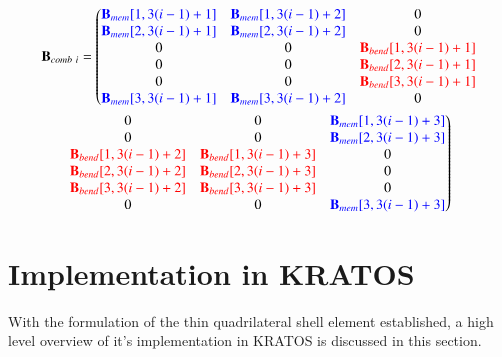 \begin{multline}
	\mathbf{B}_{comb\ i} = \left(
	\begin{matrix}
		\textcolor{blue}{\mathbf{B}_{mem}[1,3(i-1) + 1]} & \textcolor{blue}{\mathbf{B}_{mem}[1,3(i-1) + 2]} & 0 \\ 
		\textcolor{blue}{\mathbf{B}_{mem}[2,3(i-1) + 1]} & \textcolor{blue}{\mathbf{B}_{mem}[2,3(i-1) + 2]} & 0 \\ 
		0 & 0 & \textcolor{red}{\mathbf{B}_{bend}[1,3(i-1) + 1]} \\ 
		0 & 0 & \textcolor{red}{\mathbf{B}_{bend}[2,3(i-1) + 1]} \\
		0 & 0 & \textcolor{red}{\mathbf{B}_{bend}[3,3(i-1) + 1]} \\
		\textcolor{blue}{\mathbf{B}_{mem}[3,3(i-1) + 1]} & \textcolor{blue}{\mathbf{B}_{mem}[3,3(i-1) + 2]} & 0 \\
	\end{matrix}\right.                
	\\
	\left.
	\begin{matrix}
		0 & 0 & \textcolor{blue}{\mathbf{B}_{mem}[1,3(i-1) + 3]} \\ 
		0 & 0 & \textcolor{blue}{\mathbf{B}_{mem}[2,3(i-1) + 3]} \\ 
		\textcolor{red}{\mathbf{B}_{bend}[1,3(i-1) + 2]} & \textcolor{red}{\mathbf{B}_{bend}[1,3(i-1) + 3]} & 0 \\ 
		\textcolor{red}{\mathbf{B}_{bend}[2,3(i-1) + 2]} & \textcolor{red}{\mathbf{B}_{bend}[2,3(i-1) + 3]} & 0 \\
		\textcolor{red}{\mathbf{B}_{bend}[3,3(i-1) + 2]} & \textcolor{red}{\mathbf{B}_{bend}[3,3(i-1) + 3]} & 0 \\
		0 & 0 & \textcolor{blue}{\mathbf{B}_{mem}[3,3(i-1) + 3]} \\
	\end{matrix}\right)
	\label{equation33}
\end{multline}







\section{Implementation in KRATOS}

With the formulation of the thin quadrilateral shell element established, a high level overview of it's implementation in KRATOS is discussed in this section.\\

